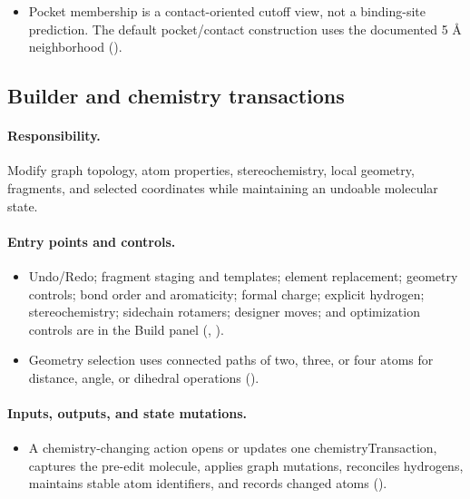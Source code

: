 \documentclass[11pt]{article}
\begin{document}
\begin{small}
\begin{itemize}[leftmargin=*]
\item Pocket membership is a contact-oriented cutoff view, not a binding-site prediction. The default pocket/contact construction uses the documented 5 \AA{} neighborhood ().

\end{itemize}

\subsection{Builder and chemistry transactions}\label{appB:sec8}

\paragraph{Responsibility.}

Modify graph topology, atom properties, stereochemistry, local geometry, fragments, and selected coordinates while maintaining an undoable molecular state.

\paragraph{Entry points and controls.}

\begin{itemize}[leftmargin=*]

\item Undo/Redo; fragment staging and templates; element replacement; geometry controls; bond order and aromaticity; formal charge; explicit hydrogen; stereochemistry; sidechain rotamers; designer moves; and optimization controls are in the Build panel (, ).

\item Geometry selection uses connected paths of two, three, or four atoms for distance, angle, or dihedral operations ().

\end{itemize}

\paragraph{Inputs, outputs, and state mutations.}

\begin{itemize}[leftmargin=*]

\item A chemistry-changing action opens or updates one chemistryTransaction, captures the pre-edit molecule, applies graph mutations, reconciles hydrogens, maintains stable atom identifiers, and records changed atoms ().


\end{itemize}
\end{small}
\end{document}
